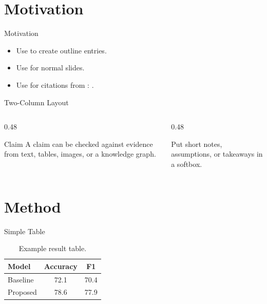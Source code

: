 
\section{Motivation}

\begin{frame}{Motivation}
    \begin{itemize}
        \item Use  to create outline entries.
        \item Use  for normal slides.
        \item Use  for citations from : \cite{kim2023factkg}.
    \end{itemize}
\end{frame}

\begin{frame}{Two-Column Layout}
    \begin{columns}[T,onlytextwidth]
        \begin{column}{0.48\textwidth}
            \begin{block}{Claim}
                A claim can be checked against evidence from text, tables, images, or a knowledge graph.
            \end{block}
        \end{column}
        \begin{column}{0.48\textwidth}
            \begin{softbox}
                Put short notes, assumptions, or takeaways in a softbox.
            \end{softbox}
        \end{column}
    \end{columns}
\end{frame}

\section{Method}

\begin{frame}{Simple Table}
    \begin{table}
        \centering
        \begin{tabular}{lcc}
            \toprule
            Model & Accuracy & F1 \\
            \midrule
            Baseline & 72.1 & 70.4 \\
            Proposed & 78.6 & 77.9 \\
            \bottomrule
        \end{tabular}
        \caption{Example result table.}
    \end{table}
\end{frame}


